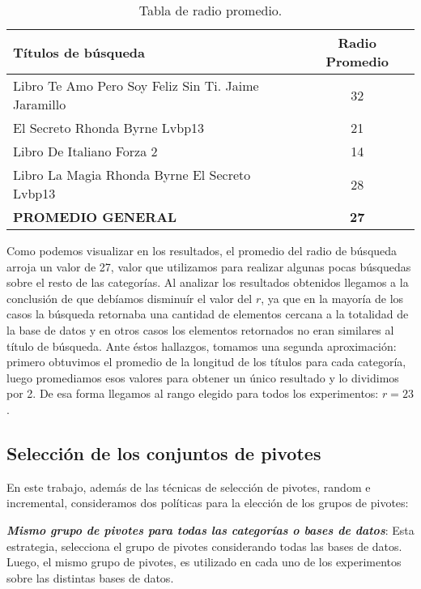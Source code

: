 \begin{table}[H]
\begin{center}
\begin{tabular}{|l|c|}
\hline 
\small T\'itulos de b\'usqueda
&
\small Radio Promedio\\
\hline \hline
\small Libro Te Amo Pero Soy Feliz Sin Ti. Jaime Jaramillo & 32  \\ \hline
\small El Secreto Rhonda Byrne Lvbp13 & 21  \\ \hline
\small Libro De Italiano Forza 2 & 14  \\ \hline
\small Libro La Magia Rhonda Byrne El Secreto Lvbp13 & 28  \\ \hline  \hline
\hspace{4cm}  \textbf{\small PROMEDIO GENERAL} & \textbf{27} \\ \hline
\end{tabular}
\caption{\small Tabla de radio promedio.}
\label{tabla:promedios-rank}
\end{center}
\end{table}

Como podemos visualizar en los resultados, el promedio del radio de b\'usqueda arroja un valor de 27, valor que utilizamos para realizar algunas pocas b\'usquedas sobre el resto de las categor\'ias. Al analizar los resultados obtenidos llegamos a la conclusi\'on de que deb\'iamos disminu\'ir el valor del $r$, ya que en la mayor\'ia de los casos la b\'usqueda retornaba una cantidad de elementos cercana a la totalidad de la base de datos y en otros casos los elementos retornados no eran similares al t\'itulo de b\'usqueda. Ante \'estos hallazgos, tomamos una segunda aproximaci\'on: primero obtuvimos el promedio de la longitud de los t\'itulos para cada categor\'ia, luego promediamos esos valores para obtener un \'unico resultado y lo dividimos por 2.  De esa forma llegamos al rango elegido para todos los experimentos: $r=23$.\\


\subsection{Selecci\'on de los conjuntos de pivotes}

En este trabajo, adem\'as de las t\'ecnicas de selecci\'on de pivotes, random e incremental, consideramos dos pol\'iticas para la elecci\'on de los grupos de pivotes:

\textit{\textbf{Mismo grupo de pivotes para todas las categor\'ias o bases de datos}}: Esta estrategia, selecciona el grupo de pivotes considerando todas las bases de datos. Luego, el mismo grupo de pivotes, es utilizado en cada uno de los experimentos sobre las distintas bases de datos.\\

